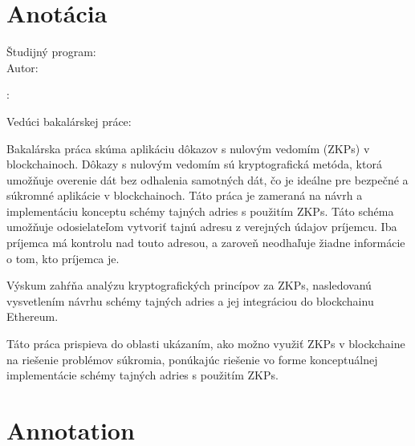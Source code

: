 \thispagestyle{empty}

\vspace*{\fill}

\section*{Anotácia}

\begin{minipage}[t]{1\columnwidth}
    \FIITuniversitySK

    \FIITfacultySK

    Študijný program: \FIITstudyProgramSK\\

    Autor: \FIITauthor

    \FIITthesisSK: \FIITtitleSK

    Vedúci bakalárskej práce: \FIITsupervisor

    \FIITdateSK
\end{minipage}

\bigskip{}

Bakalárska práca skúma aplikáciu dôkazov s nulovým vedomím (ZKPs) v
blockchainoch. Dôkazy s nulovým vedomím sú kryptografická metóda, ktorá
umožňuje overenie dát bez odhalenia samotných dát, čo je ideálne pre bezpečné
a súkromné aplikácie v blockchainoch. Táto práca je zameraná na návrh
a implementáciu konceptu schémy tajných adries s použitím ZKPs. Táto schéma
umožňuje odosielateľom vytvoriť tajnú adresu z verejných údajov príjemcu.
Iba príjemca má kontrolu nad touto adresou, a zaroveň neodhaľuje žiadne informácie
o tom, kto príjemca je.

Výskum zahŕňa analýzu kryptografických princípov za ZKPs, nasledovanú
vysvetlením návrhu schémy tajných adries a jej integráciou do blockchainu Ethereum.

Táto práca prispieva do oblasti ukázaním, ako možno využiť ZKPs v blockchaine
na riešenie problémov súkromia, ponúkajúc riešenie vo forme konceptuálnej
implementácie schémy tajných adries s použitím ZKPs.

\newpage{}\thispagestyle{empty}\medskip{}

\thispagestyle{empty}

\vspace*{\fill}

\section*{Annotation}

